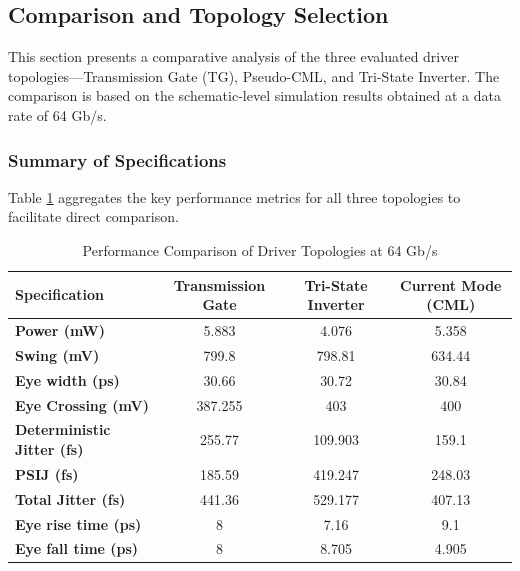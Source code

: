 \documentclass[12pt, a4paper]{report}
\begin{document}
\subsection{Comparison and Topology Selection}
\label{subsec:topology_comparison}

This section presents a comparative analysis of the three evaluated driver topologies—Transmission Gate (TG), Pseudo-CML, and Tri-State Inverter. The comparison is based on the schematic-level simulation results obtained at a data rate of 64 Gb/s.

\subsubsection{Summary of Specifications}
Table \ref{tab:comparison_summary} aggregates the key performance metrics for all three topologies to facilitate direct comparison.

\begin{table}[H]
    \centering
    \caption{Performance Comparison of Driver Topologies at 64 Gb/s}
    \label{tab:comparison_summary}
    \renewcommand{\arraystretch}{1.3}
    \setlength{\tabcolsep}{6pt} %
    \begin{tabular}{|l|c|c|c|}
        \hline
        \textbf{Specification} & \textbf{Transmission Gate} & \textbf{Tri-State Inverter} & \textbf{Current Mode (CML)} \\ \hline
        \textbf{Power (mW)} & 5.883 & 4.076 & 5.358 \\ \hline
        \textbf{Swing (mV)} & 799.8 & 798.81 & 634.44 \\ \hline
        \textbf{Eye width (ps)} & 30.66 & 30.72 & 30.84 \\ \hline
        \textbf{Eye Crossing (mV)} & 387.255 & 403 & 400 \\ \hline
        \textbf{Deterministic Jitter (fs)} & 255.77 & 109.903 & 159.1 \\ \hline
        \textbf{PSIJ (fs)} & 185.59 & 419.247 & 248.03 \\ \hline
        \textbf{Total Jitter (fs)} & 441.36 & 529.177 & 407.13 \\ \hline
        \textbf{Eye rise time (ps)} & 8 & 7.16 & 9.1 \\ \hline
        \textbf{Eye fall time (ps)} & 8 & 8.705 & 4.905 \\ \hline
    \end{tabular}
\end{table}
\end{document}
